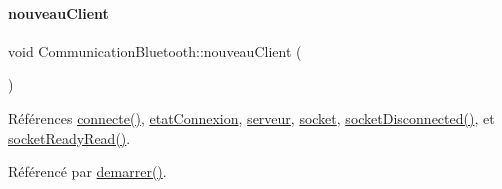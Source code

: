 \mbox{\label{class_communication_bluetooth_ab88c9bb8a1bd2c68e3d14fc3615be888}} 
\paragraph{\texorpdfstring{nouveau\+Client}{nouveauClient}}
{\footnotesize\ttfamily void Communication\+Bluetooth\+::nouveau\+Client (\begin{DoxyParamCaption}{ }\end{DoxyParamCaption})\hspace{0.3cm}{\ttfamily [slot]}}



Références \hyperlink{class_communication_bluetooth_a76f44488775d68071d43b418a7a1c75e}{connecte()}, \hyperlink{class_communication_bluetooth_ae6ab740d6e6673fcc9a9f141bd295bc4}{etat\+Connexion}, \hyperlink{class_communication_bluetooth_ace7c3b582db4257a20eb873ebfdf368a}{serveur}, \hyperlink{class_communication_bluetooth_aa07c388515488b3d38d37f1518bfd9d2}{socket}, \hyperlink{class_communication_bluetooth_a87e96f5362c1334adb3c930566ca9b88}{socket\+Disconnected()}, et \hyperlink{class_communication_bluetooth_a28b131a307d4a799f4f8d7b6969fa9ca}{socket\+Ready\+Read()}.



Référencé par \hyperlink{class_communication_bluetooth_a056f2cb0ff59757e027a430e356e22bc}{demarrer()}.


